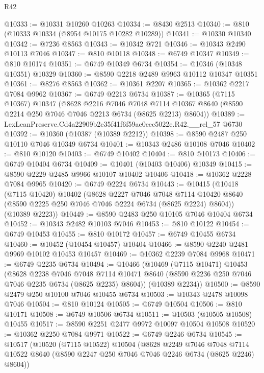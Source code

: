 \begin{lexlean}{R42}
\begin{coremodule}
{@10333 := @10331 @10260 @10263
@10334 := @8430 @2513
@10340 := @810 (@10333 @10334 (@8954 @10175 @10282 @10289))
@10341 := @10330 @10340
@10342 := @7236 @8563
@10343 := @10342 @721
@10346 := @10343 @2490 @10113 @7046
@10347 := @810 @10118
@10348 := @6749 @10347
@10349 := @810 @10174
@10351 := @6749 @10349 @6734
@10354 := @10346 (@10348 @10351) @10329
@10360 := @8590 @2218 @2489 @9963 @10112 @10347 @10351
@10361 := @8276 @8563
@10362 := @10361 @2207
@10365 := @10362 @2217 @7084 @9962
@10367 := @6749 @2213 @6734
@10387 := @10365
    (@7115 @10367)
    @10347
    (@8628
      @2216
      @7046
      @7048
      @7114
      @10367
      @8640
      (@8590 @2214 @250 @7046 @7046 @2213 @6734 (@8625 @2213) @8604))
@10389 := LexLeanPreserve.Cd4a22909b2c35f41f6f59ae0eec5022e.R42.__rel_57 @6730
@10392 := @10360 (@10387 (@10389 @2212))
@10398 := @8590 @2487 @250 @10110 @7046 @10349 @6734
@10401 := @10343 @2486 @10108 @7046
@10402 := @810 @10120
@10403 := @6749 @10402
@10404 := @810 @10173
@10406 := @6749 @10404 @6734
@10409 := @10401 (@10403 @10406) @10349
@10415 := @8590 @2229 @2485 @9966 @10107 @10402 @10406
@10418 := @10362 @2228 @7084 @9965
@10420 := @6749 @2224 @6734
@10443 := @10415
    (@10418
      (@7115 @10420)
      @10402
      (@8628
        @2227
        @7046
        @7048
        @7114
        @10420
        @8640
        (@8590 @2225 @250 @7046 @7046 @2224 @6734 (@8625 @2224) @8604))
      (@10389 @2223))
@10449 := @8590 @2483 @250 @10105 @7046 @10404 @6734
@10452 := @10343 @2482 @10103 @7046
@10453 := @810 @10122
@10454 := @6749 @10453
@10455 := @810 @10172
@10457 := @6749 @10455 @6734
@10460 := @10452 (@10454 @10457) @10404
@10466 := @8590 @2240 @2481 @9969 @10102 @10453 @10457
@10469 := @10362 @2239 @7084 @9968
@10471 := @6749 @2235 @6734
@10494 := @10466
    (@10469
      (@7115 @10471)
      @10453
      (@8628
        @2238
        @7046
        @7048
        @7114
        @10471
        @8640
        (@8590 @2236 @250 @7046 @7046 @2235 @6734 (@8625 @2235) @8604))
      (@10389 @2234))
@10500 := @8590 @2479 @250 @10100 @7046 @10455 @6734
@10503 := @10343 @2478 @10098 @7046
@10504 := @810 @10124
@10505 := @6749 @10504
@10506 := @810 @10171
@10508 := @6749 @10506 @6734
@10511 := @10503 (@10505 @10508) @10455
@10517 := @8590 @2251 @2477 @9972 @10097 @10504 @10508
@10520 := @10362 @2250 @7084 @9971
@10522 := @6749 @2246 @6734
@10545 := @10517
    (@10520
      (@7115 @10522)
      @10504
      (@8628
        @2249
        @7046
        @7048
        @7114
        @10522
        @8640
        (@8590 @2247 @250 @7046 @7046 @2246 @6734 (@8625 @2246) @8604))
}
\end{coremodule}
\end{lexlean}
